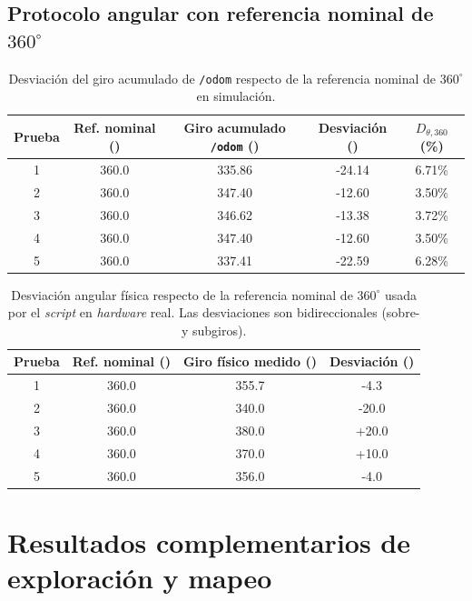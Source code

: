 \begin{appendices}
\subsection{Protocolo angular con referencia nominal de \texorpdfstring{$360^\circ$}{360°}}

\begin{table}[H]
\centering
\caption{Desviación del giro acumulado de \texttt{/odom} respecto de la referencia nominal de $360^\circ$ en simulación.}
\label{tab:odom_giro_sim}
\small
\begin{tabular}{ccccc}
\toprule
\textbf{Prueba} & \textbf{Ref. nominal (\textdegree{})} & \textbf{Giro acumulado \texttt{/odom} (\textdegree{})} & \textbf{Desviación (\textdegree{})} & \textbf{$D_{\theta,360}$ (\%)} \\
\midrule
1 & 360.0 & 335.86 & -24.14 & 6.71\% \\
2 & 360.0 & 347.40 & -12.60 & 3.50\% \\
3 & 360.0 & 346.62 & -13.38 & 3.72\% \\
4 & 360.0 & 347.40 & -12.60 & 3.50\% \\
5 & 360.0 & 337.41 & -22.59 & 6.28\% \\
\bottomrule
\end{tabular}
\end{table}

\begin{table}[H]
\centering
\caption{Desviación angular física respecto de la referencia nominal de $360^\circ$ usada por el \textit{script} en \textit{hardware} real. Las desviaciones son bidireccionales (sobre- y subgiros).}
\label{tab:odom_giro}
\small
\begin{tabular}{cccc}
\toprule
\textbf{Prueba} & \textbf{Ref. nominal (\textdegree{})} & \textbf{Giro físico medido (\textdegree{})} & \textbf{Desviación (\textdegree{})} \\
\midrule
1 & 360.0 & 355.7 & -4.3 \\
2 & 360.0 & 340.0 & -20.0 \\
3 & 360.0 & 380.0 & +20.0 \\
4 & 360.0 & 370.0 & +10.0 \\
5 & 360.0 & 356.0 & -4.0 \\

\bottomrule
\end{tabular}
\end{table}

\section{Resultados complementarios de exploración y mapeo}
\label{anx:protocolo_resultados}


\end{appendices}
